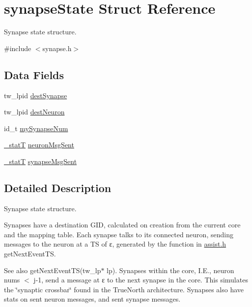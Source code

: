 \hypertarget{structsynapse_state}{}\section{synapse\+State Struct Reference}
\label{structsynapse_state}


Synapse state structure.  




{\ttfamily \#include $<$synapse.\+h$>$}

\subsection*{Data Fields}
\begin{DoxyCompactItemize}
\item 
tw\+\_\+lpid \hyperlink{structsynapse_state_a665999819b255f36d756f17b85bc9a03}{dest\+Synapse}
\item 
tw\+\_\+lpid \hyperlink{structsynapse_state_a0710dca002b4b3a3f7ae72633bef3691}{dest\+Neuron}
\item 
id\+\_\+t \hyperlink{structsynapse_state_ab73db495221608d3eae73d51670d29f0}{my\+Synapse\+Num}
\item 
\hyperlink{assist_8h_ad77e6fc5a9b03d46e7c97b7c4b92e89f}{\+\_\+stat\+T} \hyperlink{structsynapse_state_a9e389b0b50f9ec5e3f5b7b0f5383d6d5}{neuron\+Msg\+Sent}
\item 
\hyperlink{assist_8h_ad77e6fc5a9b03d46e7c97b7c4b92e89f}{\+\_\+stat\+T} \hyperlink{structsynapse_state_a3fd766946f24d2fd6a2021ec24939284}{synapse\+Msg\+Sent}
\end{DoxyCompactItemize}


\subsection{Detailed Description}
Synapse state structure. 

Synapses have a destination G\+I\+D, calculated on creation from the current core and the mapping table. Each synapse talks to its connected neuron, sending messages to the neuron at a T\+S of ε, generated by the function in \hyperlink{assist_8h}{assist.\+h} get\+Next\+Event\+T\+S. \begin{DoxySeeAlso}{See also}
get\+Next\+Event\+T\+S(tw\+\_\+lp$\ast$ lp). Synapses within the core, I.\+E., neuron nums $<$ j-\/1, send a message at ε to the next synapse in the core. This simulates the \char`\"{}synaptic crossbar\char`\"{} found in the True\+North architecture. Synapses also have stats on sent neuron messages, and sent synapse messages. 
\end{DoxySeeAlso}


